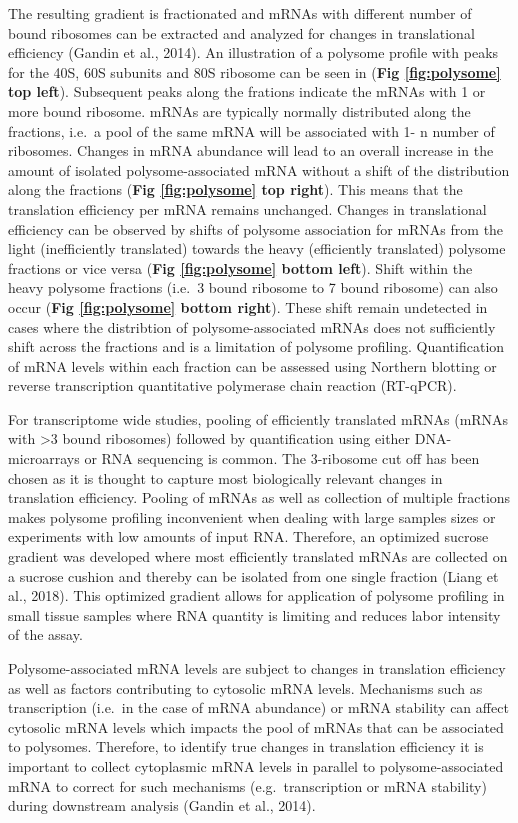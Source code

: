 \documentclass[12pt,openany]{book}
\begin{document}
The resulting gradient is fractionated and mRNAs with different number
of bound ribosomes can be extracted and analyzed for changes in
translational efficiency (Gandin et al., 2014). An illustration of a
polysome profile with peaks for the 40S, 60S subunits and 80S ribosome
can be seen in (\textbf{Fig \ref{fig:polysome} top left}). Subsequent
peaks along the frations indicate the mRNAs with 1 or more bound
ribosome. mRNAs are typically normally distributed along the fractions,
i.e.~a pool of the same mRNA will be associated with 1- n number of
ribosomes. Changes in mRNA abundance will lead to an overall increase in
the amount of isolated polysome-associated mRNA without a shift of the
distribution along the fractions (\textbf{Fig \ref{fig:polysome} top
right}). This means that the translation efficiency per mRNA remains
unchanged. Changes in translational efficiency can be observed by shifts
of polysome association for mRNAs from the light (inefficiently
translated) towards the heavy (efficiently translated) polysome
fractions or vice versa (\textbf{Fig \ref{fig:polysome} bottom left}).
Shift within the heavy polysome fractions (i.e.~3 bound ribosome to 7
bound ribosome) can also occur (\textbf{Fig \ref{fig:polysome} bottom
right}). These shift remain undetected in cases where the distribtion of
polysome-associated mRNAs does not sufficiently shift across the
fractions and is a limitation of polysome profiling. Quantification of
mRNA levels within each fraction can be assessed using Northern blotting
or reverse transcription quantitative polymerase chain reaction
(RT-qPCR).

For transcriptome wide studies, pooling of efficiently translated mRNAs
(mRNAs with \textgreater{}3 bound ribosomes) followed by quantification
using either DNA-microarrays or RNA sequencing is common. The 3-ribosome
cut off has been chosen as it is thought to capture most biologically
relevant changes in translation efficiency. Pooling of mRNAs as well as
collection of multiple fractions makes polysome profiling inconvenient
when dealing with large samples sizes or experiments with low amounts of
input RNA. Therefore, an optimized sucrose gradient was developed where
most efficiently translated mRNAs are collected on a sucrose cushion and
thereby can be isolated from one single fraction (Liang et al., 2018).
This optimized gradient allows for application of polysome profiling in
small tissue samples where RNA quantity is limiting and reduces labor
intensity of the assay.

Polysome-associated mRNA levels are subject to changes in translation
efficiency as well as factors contributing to cytosolic mRNA levels.
Mechanisms such as transcription (i.e.~in the case of mRNA abundance) or
mRNA stability can affect cytosolic mRNA levels which impacts the pool
of mRNAs that can be associated to polysomes. Therefore, to identify
true changes in translation efficiency it is important to collect
cytoplasmic mRNA levels in parallel to polysome-associated mRNA to
correct for such mechanisms (e.g.~transcription or mRNA stability)
during downstream analysis (Gandin et al., 2014).
\end{document}
